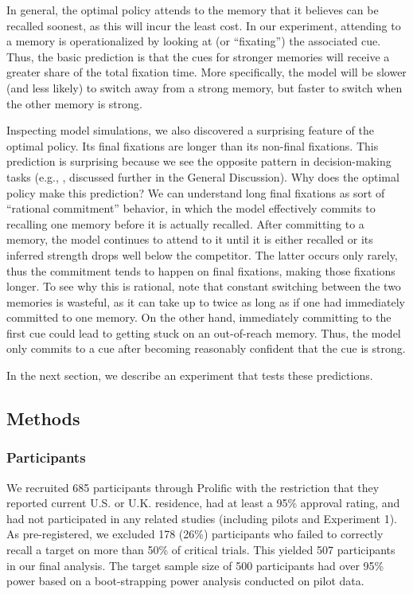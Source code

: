 In general, the optimal policy attends to the memory that it believes can be recalled soonest, as this will incur the least cost. In our experiment, attending to a memory is operationalized by looking at (or ``fixating'') the associated cue. Thus, the basic prediction is that the cues for stronger memories will receive a greater share of the total fixation time. More specifically, the model will be slower (and less likely) to switch away from a strong memory, but faster to switch when the other memory is strong.

Inspecting model simulations, we also discovered a surprising feature of the optimal policy. Its final fixations are longer than its non-final fixations. This prediction is surprising because we see the opposite pattern in decision-making tasks (e.g., \citealp{krajbich2010visual}, discussed further in the General Discussion). Why does the optimal policy make this prediction? We can understand long final fixations as sort of ``rational commitment'' behavior, in which the model effectively commits to recalling one memory before it is actually recalled. After committing to a memory, the model continues to attend to it until it is either recalled or its inferred strength drops well below the competitor. The latter occurs only rarely, thus the commitment tends to happen on final fixations, making those fixations longer. To see why this is rational, note that constant switching between the two memories is wasteful, as it can take up to twice as long as if one had immediately committed to one memory. On the other hand, immediately committing to the first cue could lead to getting stuck on an out-of-reach memory. Thus, the model only commits to a cue after becoming reasonably confident that the cue is strong.

In the next section, we describe an experiment that tests these predictions.

\subsection{Methods}

\subsubsection{Participants}

We recruited 685 participants through Prolific with the restriction that they reported current U.S. or U.K. residence, had at least a 95\% approval rating, and had not participated in any related studies (including pilots and Experiment 1). As pre-registered, we excluded 178 (26\%) participants who failed to correctly recall a target on more than 50\% of critical trials. This yielded 507 participants in our final analysis. The target sample size of 500 participants had over 95\% power based on a boot-strapping power analysis conducted on pilot data.

